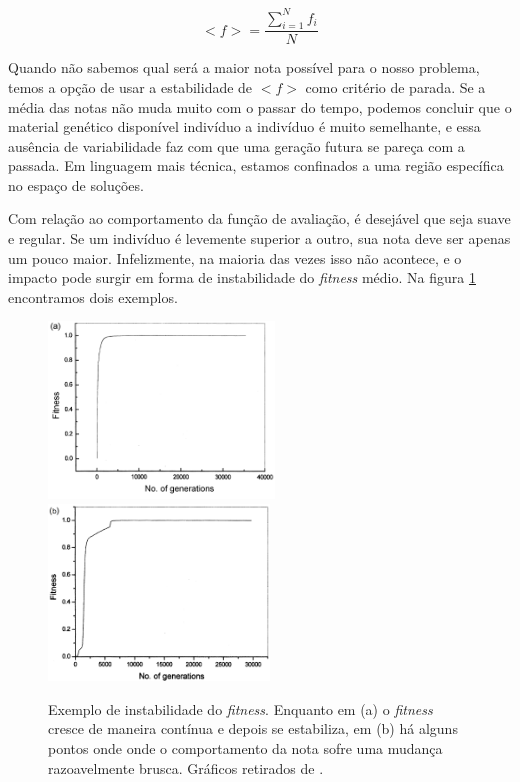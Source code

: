 	\begin{equation}\label{fitness_medio}
		<f> = \frac{\sum_{i = 1}^{N} f_i}{N}
	\end{equation}
	
	
	Quando não sabemos qual será a maior nota possível para o nosso problema, temos a opção de usar a estabilidade de $<f>$ como critério de parada. Se a média das notas não muda muito com o passar do tempo, podemos concluir que o material genético disponível indivíduo a indivíduo é muito semelhante, e essa ausência de variabilidade faz com que uma geração futura se pareça com a passada. Em linguagem mais técnica, estamos confinados a uma região específica no espaço de soluções.
	
	Com relação ao comportamento da função de avaliação, é desejável que seja suave e regular. Se um indivíduo é levemente superior a outro, sua nota deve ser apenas um pouco maior. Infelizmente, na maioria das vezes isso não acontece, e o impacto pode surgir em forma de instabilidade do \textit{fitness} médio. Na figura \ref{figFitness} encontramos dois exemplos.

	\begin{figure}[htp]
		\begin{center}
			\includegraphics[height=4.7cm]{figs/ga/func_aval_estavel.png}
			\includegraphics[height=4.7cm]{figs/ga/func_aval_instavel.png}
		\end{center}
		\caption{\label{figFitness}Exemplo de instabilidade do \textit{fitness}. Enquanto em (a) o \textit{fitness} cresce de maneira contínua e depois se estabiliza, em (b) há alguns pontos onde onde o comportamento da nota sofre uma mudança razoavelmente brusca. Gráficos retirados de \cite{metodo2004}.}
	\end{figure}

